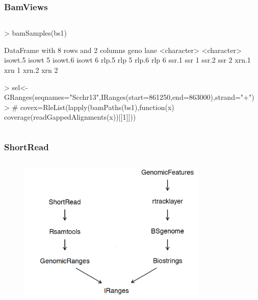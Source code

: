 \documentclass{beamer}
\begin{document}
\begin{frame}[fragile]
\frametitle{BamViews}
  \begin{column}{1.3\textwidth}
                        \begin{uncoverenv}
\begin{Schunk}
\begin{Sinput}
> bamSamples(bs1)
\end{Sinput}
\begin{Soutput}
DataFrame with 8 rows and 2 columns
               geno        lane
        <character> <character>
isowt.5       isowt           5
isowt.6       isowt           6
rlp.5           rlp           5
rlp.6           rlp           6
ssr.1           ssr           1
ssr.2           ssr           2
xrn.1           xrn           1
xrn.2           xrn           2
\end{Soutput}
\begin{Sinput}
> sel<-GRanges(seqnames="Scchr13",IRanges(start=861250,end=863000),strand="+")
> # covex=RleList(lapply(bamPaths(bs1),function(x) coverage(readGappedAlignments(x))[[1]]))
\end{Sinput}
\end{Schunk}
                        \end{uncoverenv}    
  \end{column}
\end{frame}



\begin{frame}
\frametitle{ShortRead}
\begin{column}{1\textwidth}
      \begin{figure}[ht]
      \centering
      \includegraphics[width=90mm]{diagramas/Seleccio_011.png}
      \end{figure}
  \end{column}
\end{frame}
\end{document}
